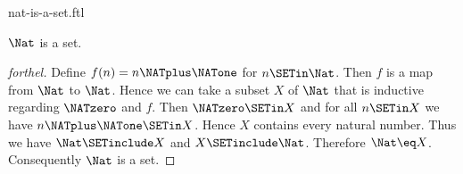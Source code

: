 \documentclass{naproche-library}
\begin{document}
\begin{smodule}[title=The Natural Numbers Form a Set]{nat-is-a-set.ftl}

\begin{proposition}[forthel,id=ARITHMETIC_07_4685510236547454]
  $\Nat$ is a set.
\end{proposition}
\begin{proof}[forthel]
  Define $f(n) = n \NATplus \NATone$ for $n \SETin \Nat$.
  Then $f$ is a map from $\Nat$ to $\Nat$.
  Hence we can take a subset $X$ of $\Nat$ that is inductive regarding
  $\NATzero$ and $f$.
  Then $\NATzero \SETin X$ and for all $n \SETin X$ we have $n \NATplus \NATone \SETin X$.
  Hence $X$ contains every natural number.
  Thus we have $\Nat \SETinclude X$ and $X \SETinclude \Nat$.
  Therefore $\Nat \eq X$.
  Consequently $\Nat$ is a set.
\end{proof}
\end{smodule}
\end{document}

